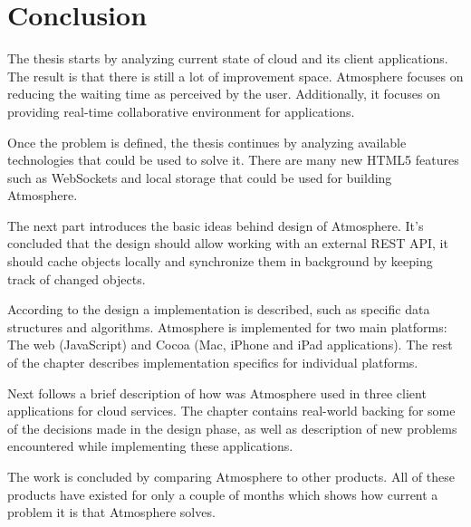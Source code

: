 \section{Conclusion}

The thesis starts by analyzing current state of cloud and its client applications. The result is that there is still a lot of improvement space. Atmosphere focuses on reducing the waiting time as perceived by the user. Additionally, it focuses on providing real-time collaborative environment for applications.

Once the problem is defined, the thesis continues by analyzing available technologies that could be used to solve it. There are many new HTML5 features such as WebSockets and local storage that could be used for building Atmosphere. 

The next part introduces the basic ideas behind design of Atmosphere. It's concluded that the design should allow working with an external REST API, it should cache objects locally and synchronize them in background by keeping track of changed objects.

According to the design a implementation is described, such as specific data structures and algorithms. Atmosphere is implemented for two main platforms: The web (JavaScript) and Cocoa (Mac, iPhone and iPad applications). The rest of the chapter describes implementation specifics for individual platforms.

Next follows a brief description of how was Atmosphere used in three client applications for cloud services. The chapter contains real-world backing for some of the decisions made in the design phase, as well as description of new problems encountered while implementing these applications.

The work is concluded by comparing Atmosphere to other products. All of these products have existed for only a couple of months which shows how current a problem it is that Atmosphere solves.